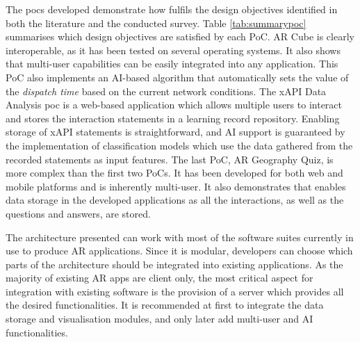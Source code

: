 The \glspl{poc} developed demonstrate how \arch{} fulfils the design objectives identified in both the literature and the conducted survey. Table \ref{tab:summarypoc} summarises which design objectives are satisfied by each PoC. AR Cube is clearly interoperable, as it has been tested on several operating systems. It also shows that multi-user capabilities can be easily integrated into any application. This PoC also implements an AI-based algorithm that automatically sets the value of the \textit{dispatch time} based on the current network conditions. The xAPI Data Analysis \gls{poc} is a web-based application which allows multiple users to interact and stores the interaction statements in a learning record repository. Enabling storage of xAPI statements is straightforward, and AI support is guaranteed by the implementation of classification models which use the data gathered from the recorded statements as input features. The last PoC, AR Geography Quiz, is more complex than the first two PoCs. It has been developed for both web and mobile platforms and is inherently multi-user. It also demonstrates that \arch{} enables data storage in the developed applications as all the interactions, as well as the questions and answers, are stored.



The architecture presented can work with most of the software suites currently in use to produce AR applications. Since it is modular, developers can choose which parts of the architecture should be integrated into existing applications. As the majority of existing AR apps are client only, the most critical aspect for integration with existing software is the provision of a server which provides all the desired functionalities. It is recommended at first to integrate the data storage and visualisation modules, and only later add multi-user and AI functionalities.